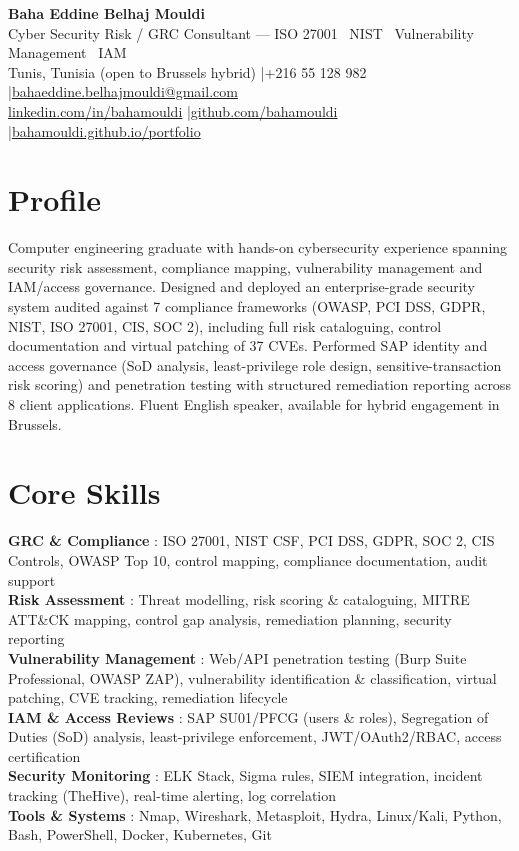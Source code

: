 \documentclass[a4paper,10pt]{article}
\begin{document}
\begin{center}
{\LARGE\bfseries\color{navy} Baha Eddine Belhaj Mouldi}\\[4pt]
{\large Cyber Security Risk / GRC Consultant --- ISO 27001 \textbar\ NIST \textbar\ Vulnerability Management \textbar\ IAM}\\[3pt]
Tunis, Tunisia (open to Brussels hybrid) \quad|\quad +216 55 128 982 \quad|\quad \href{mailto:bahaeddine.belhajmouldi@gmail.com}{bahaeddine.belhajmouldi@gmail.com}\\[1pt]
\href{https://www.linkedin.com/in/bahamouldi}{linkedin.com/in/bahamouldi} \quad|\quad \href{https://github.com/bahamouldi}{github.com/bahamouldi} \quad|\quad \href{https://bahamouldi.github.io/portfolio/}{bahamouldi.github.io/portfolio}
\end{center}
\vspace{1pt}
\section{Profile}
Computer engineering graduate with hands-on cybersecurity experience spanning security risk assessment, compliance mapping, vulnerability management and IAM/access governance. Designed and deployed an enterprise-grade security system audited against 7 compliance frameworks (OWASP, PCI DSS, GDPR, NIST, ISO 27001, CIS, SOC 2), including full risk cataloguing, control documentation and virtual patching of 37 CVEs. Performed SAP identity and access governance (SoD analysis, least-privilege role design, sensitive-transaction risk scoring) and penetration testing with structured remediation reporting across 8 client applications. Fluent English speaker, available for hybrid engagement in Brussels.
\section{Core Skills}
\textbf{GRC \& Compliance} : ISO 27001, NIST CSF, PCI DSS, GDPR, SOC 2, CIS Controls, OWASP Top 10, control mapping, compliance documentation, audit support\\[1pt]
\textbf{Risk Assessment} : Threat modelling, risk scoring \& cataloguing, MITRE ATT\&CK mapping, control gap analysis, remediation planning, security reporting\\[1pt]
\textbf{Vulnerability Management} : Web/API penetration testing (Burp Suite Professional, OWASP ZAP), vulnerability identification \& classification, virtual patching, CVE tracking, remediation lifecycle\\[1pt]
\textbf{IAM \& Access Reviews} : SAP SU01/PFCG (users \& roles), Segregation of Duties (SoD) analysis, least-privilege enforcement, JWT/OAuth2/RBAC, access certification\\[1pt]
\textbf{Security Monitoring} : ELK Stack, Sigma rules, SIEM integration, incident tracking (TheHive), real-time alerting, log correlation\\[1pt]
\textbf{Tools \& Systems} : Nmap, Wireshark, Metasploit, Hydra, Linux/Kali, Python, Bash, PowerShell, Docker, Kubernetes, Git
\end{document}
